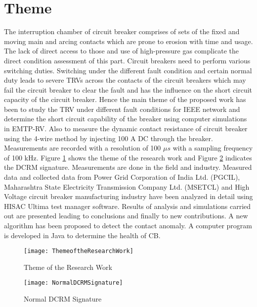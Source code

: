\section{Theme}
The interruption chamber of circuit breaker comprises of sets of the fixed and moving main and arcing contacts which are prone to erosion with time and usage. The lack of direct access to those and use of high-pressure gas complicate the direct condition assessment of this part. Circuit breakers need to perform various switching duties. Switching under the different fault condition and certain normal duty leads to severe TRVs across the contacts of the circuit breakers which may fail the circuit breaker to clear the fault and has the influence on the short circuit capacity of the circuit breaker. Hence the main theme of the proposed work has been to study the TRV under different fault conditions for IEEE network and determine the short circuit capability of the breaker using computer simulations in EMTP-RV. Also to measure the dynamic contact resistance of circuit breaker using the 4-wire method by injecting 100 A DC through the breaker. Measurements are recorded with a resolution of 100 $\mu s$ with a sampling frequency of 100 kHz. Figure \ref{fig:Theme of the Research Work} shows the theme of the research work and Figure \ref{fig:Normal DCRM Signature} indicates the DCRM signature. Measurements are done in the field and industry. Measured data and collected data from Power Grid Corporation of India Ltd. (PGCIL), Maharashtra State Electricity Transmission Company Ltd. (MSETCL) and High Voltage circuit breaker manufacturing industry have been analyzed in detail using HISAC Ultima test manager software. Results of analysis and simulations carried out are presented leading to conclusions and finally to new contributions. A new algorithm has been proposed to detect the contact anomaly. A computer program is developed in Java to determine the health of CB.


\begin{figure}[!htbp]
    \centering
    \texttt{[image: ThemeoftheResearchWork]}
    \caption{Theme of the Research Work}
    \label{fig:Theme of the Research Work}
\end{figure}

\begin{figure}[!htbp]
    \centering
    \texttt{[image: NormalDCRMSignature]}
    \caption{Normal DCRM Signature}
    \label{fig:Normal DCRM Signature}
\end{figure}

